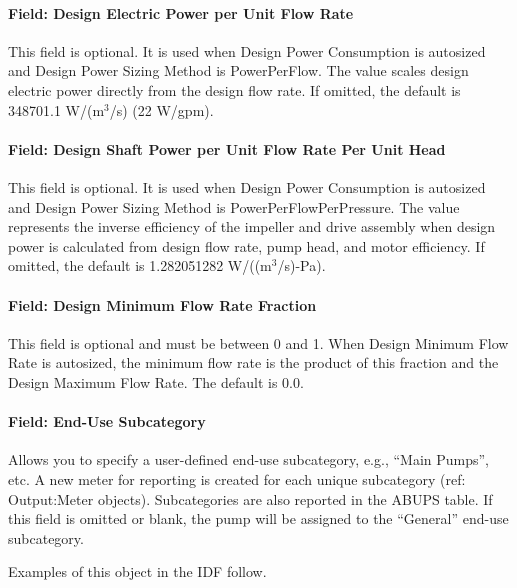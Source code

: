 \paragraph{Field: Design Electric Power per Unit Flow Rate}\label{field-design-electric-power-per-unit-flow-rate}

This field is optional. It is used when Design Power Consumption is autosized and Design Power Sizing Method is PowerPerFlow. The value scales design electric power directly from the design flow rate. If omitted, the default is 348701.1 W/(m\(^{3}\)/s) (22 W/gpm).

\paragraph{Field: Design Shaft Power per Unit Flow Rate Per Unit Head}\label{field-design-shaft-power-per-unit-flow-rate-per-unit-head}

This field is optional. It is used when Design Power Consumption is autosized and Design Power Sizing Method is PowerPerFlowPerPressure. The value represents the inverse efficiency of the impeller and drive assembly when design power is calculated from design flow rate, pump head, and motor efficiency. If omitted, the default is 1.282051282 W/((m\(^{3}\)/s)-Pa).

\paragraph{Field: Design Minimum Flow Rate Fraction}\label{field-design-minimum-flow-rate-sizing-factor}

This field is optional and must be between 0 and 1. When Design Minimum Flow Rate is autosized, the minimum flow rate is the product of this fraction and the Design Maximum Flow Rate. The default is 0.0.

\paragraph{Field: End-Use Subcategory}\label{field-end-use-subcategory-1-000}

Allows you to specify a user-defined end-use subcategory, e.g., ``Main Pumps'', etc. A new meter for reporting is created for each unique subcategory (ref: Output:Meter objects). Subcategories are also reported in the ABUPS table. If this field is omitted or blank, the pump will be assigned to the ``General'' end-use subcategory.

Examples of this object in the IDF follow.

